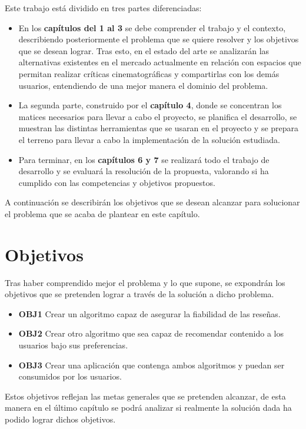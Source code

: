 Este trabajo está dividido en tres partes diferenciadas:
\begin{itemize}
    \item En los \textbf{capítulos del 1 al 3} se debe comprender el trabajo y el contexto, 
    describiendo posteriormente el problema que se quiere resolver y los objetivos que se desean 
    lograr. Tras esto, en el estado del arte se analizarán las alternativas existentes en el mercado 
    actualmente en relación con espacios que permitan realizar críticas cinematográficas y compartirlas 
    con los demás usuarios, entendiendo de una mejor manera el dominio del problema.
    \item La segunda parte, construido por el \textbf{capítulo 4}, donde se concentran los matices 
    necesarios para llevar a cabo el proyecto, se planifica el desarrollo, se muestran las distintas herramientas que se usaran en el proyecto y se prepara el terreno para llevar a 
    cabo la implementación de la solución estudiada.
    \item Para terminar, en los \textbf{capítulos 6 y 7} se realizará todo el trabajo de desarrollo y 
    se evaluará la resolución de la propuesta, valorando si ha cumplido con las competencias y 
    objetivos propuestos.
\end{itemize}

A continuación se describirán los objetivos que se desean alcanzar para solucionar el problema que se 
acaba de plantear en este capítulo.

\section{Objetivos}

Tras haber comprendido mejor el problema y lo que supone, se expondrán los objetivos que se pretenden 
lograr a través de la solución a dicho problema.

\begin{itemize}
    \item \textbf{OBJ1} Crear un algoritmo capaz de asegurar la fiabilidad de las reseñas.
    \item \textbf{OBJ2} Crear otro algoritmo que sea capaz de recomendar contenido a los usuarios bajo sus preferencias.
    \item \textbf{OBJ3} Crear una aplicación que contenga ambos algoritmos y puedan ser consumidos por los usuarios.
\end{itemize}

Estos objetivos reflejan las metas generales que se pretenden alcanzar, de esta manera en el último 
capítulo se podrá analizar si realmente la solución dada ha podido lograr dichos objetivos.

